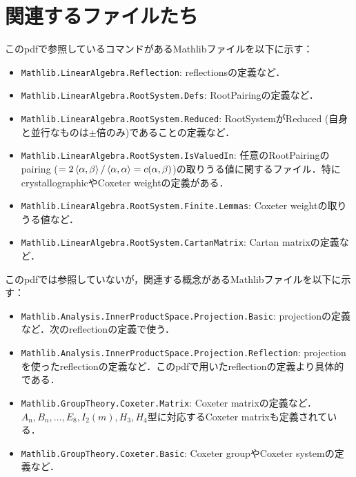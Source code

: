 %

\section{関連するファイルたち}
このpdfで参照しているコマンドがあるMathlibファイルを以下に示す：
\begin{itemize}
  \item {\color{orange} \texttt{Mathlib.LinearAlgebra.Reflection}}: reflectionsの定義など．
  \item {\color{orange} \texttt{Mathlib.LinearAlgebra.RootSystem.Defs}}: RootPairingの定義など．
  \item {\color{orange} \texttt{Mathlib.LinearAlgebra.RootSystem.Reduced}}: RootSystemがReduced (自身と並行なものは$\pm$倍のみ)であることの定義など．
  \item {\color{orange} \texttt{Mathlib.LinearAlgebra.RootSystem.IsValuedIn}}: 任意のRootPairingのpairing ($= 2 \left\langle \alpha, \beta \right\rangle / \left\langle \alpha, \alpha \right\rangle = c(\alpha, \beta)$)の取りうる値に関するファイル．特にcrystallographicやCoxeter weightの定義がある．
  \item {\color{orange} \texttt{Mathlib.LinearAlgebra.RootSystem.Finite.Lemmas}}: Coxeter weightの取りうる値など．
  \item {\color{orange} \texttt{Mathlib.LinearAlgebra.RootSystem.CartanMatrix}}: Cartan matrixの定義など．
\end{itemize}

このpdfでは参照していないが，関連する概念があるMathlibファイルを以下に示す：
\begin{itemize}
  \item {\color{orange} \texttt{Mathlib.Analysis.InnerProductSpace.Projection.Basic}}: projectionの定義など．次のreflectionの定義で使う．
  \item {\color{orange} \texttt{Mathlib.Analysis.InnerProductSpace.Projection.Reflection}}: projectionを使ったreflectionの定義など．このpdfで用いたreflectionの定義より具体的である．
  \item {\color{orange} \texttt{Mathlib.GroupTheory.Coxeter.Matrix}}: Coxeter matrixの定義など．$A_n, B_n, \ldots, E_8, I_2(m), H_3, H_4$型に対応するCoxeter matrixも定義されている．
  \item {\color{orange} \texttt{Mathlib.GroupTheory.Coxeter.Basic}}: Coxeter groupやCoxeter systemの定義など．
\end{itemize}

